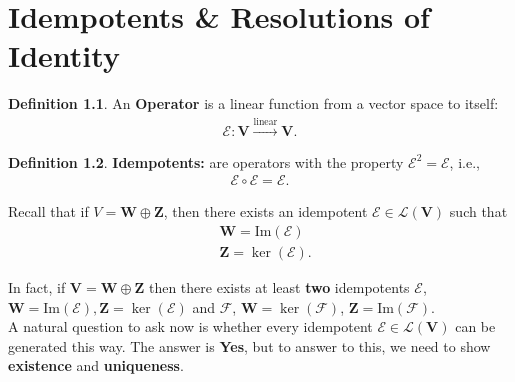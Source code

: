 \documentclass{book}
\theoremstyle{definition}
\newtheorem{defn}{Definition}[section]
\newcommand{\F}{\mathcal{F}}
\newcommand{\V}{\mathbf{V}}
\newcommand{\W}{\mathbf{W}}
\newcommand{\Z}{\mathbf{Z}}
\newcommand{\lag}{\mathcal{L}}
\newcommand{\E}{\mathcal{E}}
\newcommand{\ima}{\text{Im}}
\newcommand{\lin}{\overset{\text{linear}}{\longrightarrow}}
\begin{document}

\newpage
\chapter{Idempotents \& Resolutions of Identity}
\begin{defn}
	An \textbf{Operator} is a linear function from a vector space to itself:
	\begin{align*}
	\E : \V \lin \V.
	\end{align*}
\end{defn}


\begin{defn}
	\textbf{Idempotents:} are operators with the property $\E^2 = \E$, i.e., 
	\begin{align*}
	\E \circ \E = \E.
	\end{align*}
	
	Recall that if $V = \W \oplus \Z$, then there exists an idempotent $\E \in \lag(\V)$ such that
	\begin{align*}
	&\W = \ima(\E)\\
	&\Z = \ker(\E).
	\end{align*}
\end{defn}
In fact, if $\V = \W \oplus \Z$ then there exists at least \textbf{two} idempotents $\E$, $\W = \ima(\E), \Z = \ker(\E)$ and $\F$, $\W = \ker(\F)$, $\Z = \ima(\F)$.\\

A natural question to ask now is whether every idempotent $\E \in \lag(\V)$ can be generated this way. The answer is \textbf{Yes}, but to answer to this, we need to show \textbf{existence} and \textbf{uniqueness}. \\
\end{document}
